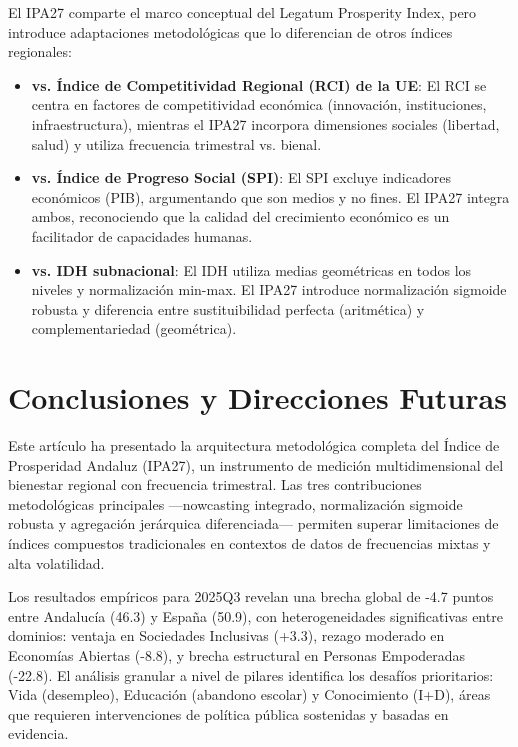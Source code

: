 \documentclass[authoryear,12pt]{elsarticle}
\begin{document}
El IPA27 comparte el marco conceptual del Legatum Prosperity Index, pero introduce adaptaciones metodológicas que lo diferencian de otros índices regionales:

\begin{itemize}
    \item \textbf{vs. Índice de Competitividad Regional (RCI) de la UE}: El RCI se centra en factores de competitividad económica (innovación, instituciones, infraestructura), mientras el IPA27 incorpora dimensiones sociales (libertad, salud) y utiliza frecuencia trimestral vs. bienal.

    \item \textbf{vs. Índice de Progreso Social (SPI)}: El SPI excluye indicadores económicos (PIB), argumentando que son medios y no fines. El IPA27 integra ambos, reconociendo que la calidad del crecimiento económico es un facilitador de capacidades humanas.

    \item \textbf{vs. IDH subnacional}: El IDH utiliza medias geométricas en todos los niveles y normalización min-max. El IPA27 introduce normalización sigmoide robusta y diferencia entre sustituibilidad perfecta (aritmética) y complementariedad (geométrica).
\end{itemize}

\section{Conclusiones y Direcciones Futuras}

Este artículo ha presentado la arquitectura metodológica completa del Índice de Prosperidad Andaluz (IPA27), un instrumento de medición multidimensional del bienestar regional con frecuencia trimestral. Las tres contribuciones metodológicas principales —nowcasting integrado, normalización sigmoide robusta y agregación jerárquica diferenciada— permiten superar limitaciones de índices compuestos tradicionales en contextos de datos de frecuencias mixtas y alta volatilidad.

Los resultados empíricos para 2025Q3 revelan una brecha global de -4.7 puntos entre Andalucía (46.3) y España (50.9), con heterogeneidades significativas entre dominios: ventaja en Sociedades Inclusivas (+3.3), rezago moderado en Economías Abiertas (-8.8), y brecha estructural en Personas Empoderadas (-22.8). El análisis granular a nivel de pilares identifica los desafíos prioritarios: Vida (desempleo), Educación (abandono escolar) y Conocimiento (I+D), áreas que requieren intervenciones de política pública sostenidas y basadas en evidencia.
\end{document}
